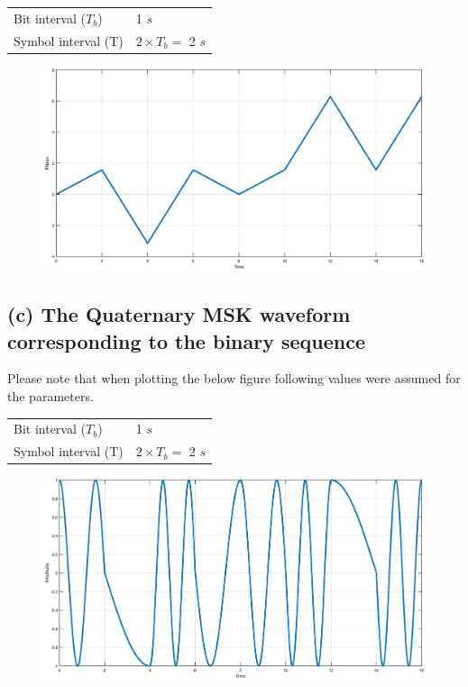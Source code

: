 \documentclass[a4paper,11pt]{article}%
\begin{document}
\begin{tabular}{l l}
	Bit interval ($T_b$) & 1 $s$ \\
	Symbol interval  (T) &$2 \times T_b = $  2 $s$
\end{tabular}

\begin{figure}[!h]
	\centering
	\includegraphics[scale=0.35]{figures/fig4b}
\end{figure}



\pagebreak
\subsection*{(c) The Quaternary MSK waveform corresponding to the binary sequence}
Please note that when plotting the below figure following values were assumed for the parameters.\\

\begin{tabular}{l l}
	Bit interval ($T_b$) & 1 $s$ \\
	Symbol interval  (T) &$2 \times T_b = $  2 $s$
\end{tabular}

\begin{figure}[!h]
	\centering
	\includegraphics[scale=0.35]{figures/fig4c}
\end{figure}


\end{document}
